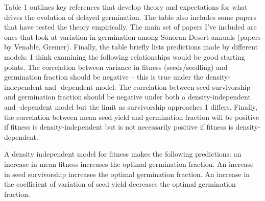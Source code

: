 \documentclass[12pt, oneside, titlepage]{article}   	%
\begin{document}
Table 1 outlines key references that develop theory and expectations for what drives the evolution of delayed germination. The table also includes some papers that have tested the theory empirically. The main set of papers I've included are ones that look at variation in germination among Sonoran Desert annuals (papers by Venable, Gremer). Finally, the table briefly lists predictions made by different models. I think examining the following relationships would be good starting points. The correlation between variance in fitness (seeds/seedling) and germination fraction should be negative -- this is true under the density-independent and -dependent model. The correlation between seed survivorship and germination fraction should be negative under both a density-independent and -dependent model but the limit as survivorship approaches 1 differs. Finally, the correlation between mean seed yield and germination fraction will be positive if fitness is density-independent but is not necessarily positive if fitness is density-dependent.

A density independent model for fitness makes the following predictions: an increase in mean fitness increases the optimal germination fraction. An increase in seed survivorship increases the optimal germination fraction. An increase in the coefficient of variation of seed yield decreases the optimal germination fraction.  
\end{document}
